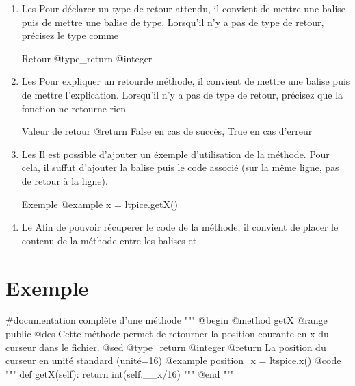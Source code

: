 \begin{enumerate}
    Lorsque il n'y a aucun argument, ne mettez pas de balise @input.
   
    \item Les  \newline
    Pour déclarer un type de retour attendu, il convient de mettre une balise  puis de mettre une balise de type. \newline
    Lorsqu'il n'y a pas de type de retour, précisez le type comme 
\begin{Bash}{Retour}
@type_return @integer
\end{Bash}
    
    \item Les  \newline
    Pour expliquer un retourde méthode, il convient de mettre une balise  puis de mettre l'explication. \newline
    Lorsqu'il n'y a pas de type de retour, précisez que la fonction ne retourne rien 
\begin{Bash}{Valeur de retour}
@return False en cas de succès, True en cas d'erreur
\end{Bash}


    \item Les  \newline
    Il est possible d'ajouter un éxemple d'utilisation de la méthode. Pour cela, il suffut d'ajouter la balise  puis le code associé (sur la même ligne, pas de retour à la ligne).
\begin{Bash}{Exemple}
@example x = ltpice.getX()
\end{Bash}

    \item Le  \newline
    Afin de pouvoir récuperer le code de la méthode, il convient de placer le contenu de la méthode entre les balises  et 

    
\end{enumerate}


\newpage
\section{Exemple}


\begin{Python}
  #documentation complète d'une méthode
	"""
	@begin
	@method getX
	@range public
	@des 
	Cette méthode permet de retourner la position courante en x du curseur dans le fichier.
	@sed
	@type_return @integer
	@return La position du curseur en unité standard (unité=16)
	@example position_x = ltspice.x()
	@code
	"""
	def getX(self):
		return int(self.__x/16)
	"""
	@end
	"""
\end{Python}

